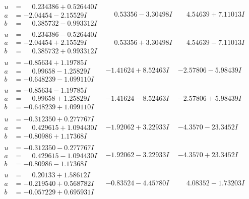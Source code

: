 \documentclass[1p]{elsarticle_modified}
\theoremstyle{definition}
\begin{document}
$$\begin{array}{c|c|c}
\begin{aligned}
u &= \phantom{-}0.234386 + 0.526440 I \\
a &= -2.04454 - 2.15529 I \\
b &= \phantom{-}0.385732 - 0.993312 I\end{aligned}
 & \phantom{-}0.53356 - 3.30498 I & \phantom{-}4.54639 + 7.11013 I \\ \hline\begin{aligned}
u &= \phantom{-}0.234386 - 0.526440 I \\
a &= -2.04454 + 2.15529 I \\
b &= \phantom{-}0.385732 + 0.993312 I\end{aligned}
 & \phantom{-}0.53356 + 3.30498 I & \phantom{-}4.54639 - 7.11013 I \\ \hline\begin{aligned}
u &= -0.85634 + 1.19785 I \\
a &= \phantom{-}0.99658 - 1.25829 I \\
b &= -0.648239 - 1.099110 I\end{aligned}
 & -1.41624 + 8.52463 I & -2.57806 - 5.98439 I \\ \hline\begin{aligned}
u &= -0.85634 - 1.19785 I \\
a &= \phantom{-}0.99658 + 1.25829 I \\
b &= -0.648239 + 1.099110 I\end{aligned}
 & -1.41624 - 8.52463 I & -2.57806 + 5.98439 I \\ \hline\begin{aligned}
u &= -0.312350 + 0.277767 I \\
a &= \phantom{-}0.429615 + 1.094430 I \\
b &= -0.80986 + 1.17368 I\end{aligned}
 & -1.92062 + 3.22933 I & -4.3570 - 23.3452 I \\ \hline\begin{aligned}
u &= -0.312350 - 0.277767 I \\
a &= \phantom{-}0.429615 - 1.094430 I \\
b &= -0.80986 - 1.17368 I\end{aligned}
 & -1.92062 - 3.22933 I & -4.3570 + 23.3452 I \\ \hline\begin{aligned}
u &= \phantom{-}0.20133 + 1.58612 I \\
a &= -0.219540 + 0.568782 I \\
b &= -0.057229 + 0.695931 I\end{aligned}
 & -0.83524 - 4.45780 I & \phantom{-}4.08352 - 1.73203 I \\ \hline\begin{aligned}

\end{aligned}
\end{array}$$
\end{document}
